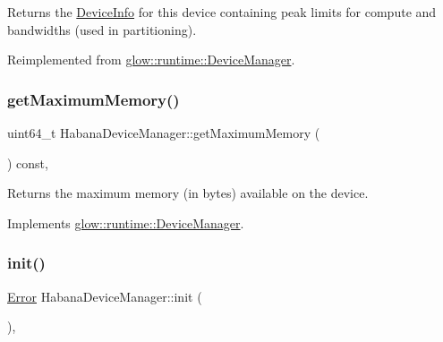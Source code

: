 Returns the \hyperlink{structglow_1_1runtime_1_1_device_info}{Device\+Info} for this device containing peak limits for compute and bandwidths (used in partitioning). 

Reimplemented from \hyperlink{classglow_1_1runtime_1_1_device_manager_aaf319fc3b9aa67c5e053bdf690e89d34}{glow\+::runtime\+::\+Device\+Manager}.

\mbox{\label{classglow_1_1runtime_1_1_habana_device_manager_a2e8ddfc33d1a4f482bcd1f9a5e4e5350}} 
\subsubsection{\texorpdfstring{get\+Maximum\+Memory()}{getMaximumMemory()}}
{\footnotesize\ttfamily uint64\+\_\+t Habana\+Device\+Manager\+::get\+Maximum\+Memory (\begin{DoxyParamCaption}{ }\end{DoxyParamCaption}) const\hspace{0.3cm}{\ttfamily [override]}, {\ttfamily [virtual]}}

\begin{DoxyReturn}{Returns}
the maximum memory (in bytes) available on the device. 
\end{DoxyReturn}


Implements \hyperlink{classglow_1_1runtime_1_1_device_manager_ad158f1c1f9f32b48927f50d48f80decb}{glow\+::runtime\+::\+Device\+Manager}.

\mbox{\label{classglow_1_1runtime_1_1_habana_device_manager_af5d6a6e9e3ee7a71356e63c89cda50be}} 
\subsubsection{\texorpdfstring{init()}{init()}}
{\footnotesize\ttfamily \hyperlink{namespaceglow_afdb176c3a672ef66db0ecfc19a8d39bf}{Error} Habana\+Device\+Manager\+::init (\begin{DoxyParamCaption}{ }\end{DoxyParamCaption})\hspace{0.3cm}{\ttfamily [override]}, {\ttfamily [virtual]}}

